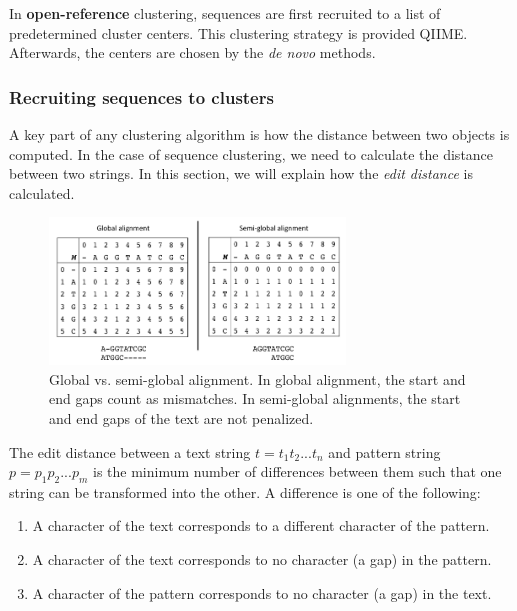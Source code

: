 In {\bf open-reference} clustering, sequences are first recruited to a list of predetermined cluster centers.
This clustering strategy is provided QIIME.
Afterwards, the centers are chosen by the \emph{de novo} methods.

\subsubsection{Recruiting sequences to clusters}

A key part of any clustering algorithm is how the distance between two objects is computed.
In the case of sequence clustering, we need to calculate the distance between two strings.
In this section, we will explain how the \emph{edit distance} is calculated. 

\begin{figure}[b!]
  \centering
    \includegraphics[width=0.7\textwidth]{global_semiglobal}
  \caption{Global vs. semi-global alignment.  In global alignment, the start and end gaps count as mismatches.  In semi-global alignments, the start and end gaps of the text are not penalized.}
  \label{fig:global_vs_semiglobal}
\end{figure}


\begin{definition}
The edit distance between a text string $t = t_1 t_2 ... t_n$ and pattern string $p = p_1 p_2  ... p_m$ is the minimum number of differences between them such that one string can be transformed into the other.
A difference is one of the following:
\begin{enumerate}

  \item A character of the text corresponds to a different character of the pattern.
  \item A character of the text corresponds to no character (a gap) in the pattern.
  \item A character of the pattern corresponds to no character (a gap) in the text.

\end{enumerate}
\end{definition}

